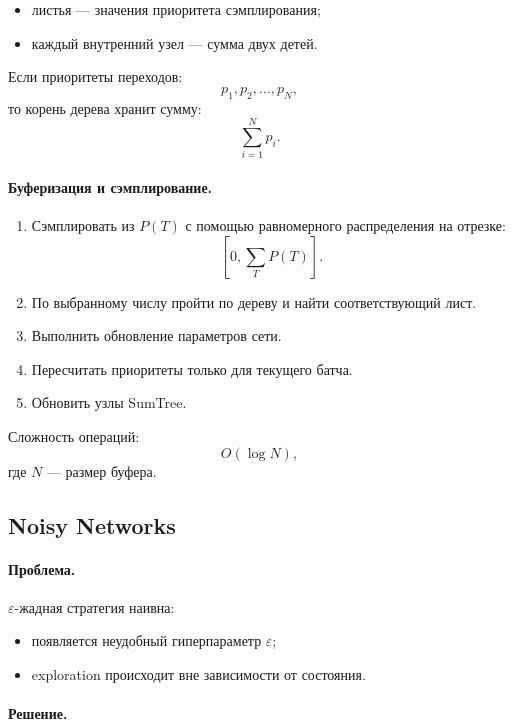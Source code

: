 \documentclass[12pt,a4paper]{article}
\begin{document}
\begin{itemize}
    \item листья --- значения приоритета сэмплирования;
    \item каждый внутренний узел --- сумма двух детей.
\end{itemize}

Если приоритеты переходов:
\[
p_1,p_2,\ldots,p_N,
\]
то корень дерева хранит сумму:
\[
\sum_{i=1}^{N} p_i.
\]

\paragraph{Буферизация и сэмплирование.}

\begin{enumerate}
    \item Сэмплировать из $P(T)$ с помощью равномерного распределения на отрезке:
    \[
    \left[
    0,
    \sum_T P(T)
    \right].
    \]

    \item По выбранному числу пройти по дереву и найти соответствующий лист.

    \item Выполнить обновление параметров сети.

    \item Пересчитать приоритеты только для текущего батча.

    \item Обновить узлы SumTree.
\end{enumerate}

Сложность операций:
\[
O(\log N),
\]
где $N$ --- размер буфера.

\subsection{Noisy Networks}

\paragraph{Проблема.}

$\varepsilon$-жадная стратегия наивна:
\begin{itemize}
    \item появляется неудобный гиперпараметр $\varepsilon$;
    \item exploration происходит вне зависимости от состояния.
\end{itemize}

\paragraph{Решение.}
\end{document}
